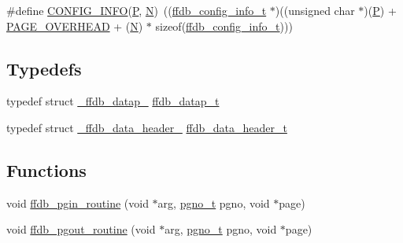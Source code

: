 \begin{DoxyCompactItemize}
\item 
\#define \mbox{\hyperlink{adat-devel_2other__libs_2filedb_2filehash_2ffdb__page_8h_a27811a032e8248cf27b27041873d8de0}{C\+O\+N\+F\+I\+G\+\_\+\+I\+N\+FO}}(\mbox{\hyperlink{adat__devel_2lib_2hadron_2operator__name__util_8cc_aef94be98e2c9e4a4dece75f60ca9792c}{P}},  \mbox{\hyperlink{adat__devel_2lib_2hadron_2operator__name__util_8cc_a7722c8ecbb62d99aee7ce68b1752f337}{N}})~((\mbox{\hyperlink{adat-devel_2other__libs_2filedb_2filehash_2ffdb__db_8h_acc961fbd2faf6a849a1620309100fda1}{ffdb\+\_\+config\+\_\+info\+\_\+t}} $\ast$)((unsigned char $\ast$)(\mbox{\hyperlink{adat__devel_2lib_2hadron_2operator__name__util_8cc_aef94be98e2c9e4a4dece75f60ca9792c}{P}}) + \mbox{\hyperlink{adat__devel_2other__libs_2filedb_2filehash_2ffdb__page_8h_a4be3c5b1517f8928d9819032d1ac4864}{P\+A\+G\+E\+\_\+\+O\+V\+E\+R\+H\+E\+AD}} + (\mbox{\hyperlink{adat__devel_2lib_2hadron_2operator__name__util_8cc_a7722c8ecbb62d99aee7ce68b1752f337}{N}}) $\ast$ sizeof(\mbox{\hyperlink{adat-devel_2other__libs_2filedb_2filehash_2ffdb__db_8h_acc961fbd2faf6a849a1620309100fda1}{ffdb\+\_\+config\+\_\+info\+\_\+t}})))
\end{DoxyCompactItemize}
\subsection*{Typedefs}
\begin{DoxyCompactItemize}
\item 
typedef struct \mbox{\hyperlink{struct__ffdb__datap__}{\+\_\+ffdb\+\_\+datap\+\_\+}} \mbox{\hyperlink{adat-devel_2other__libs_2filedb_2filehash_2ffdb__page_8h_af1593018f0ec0e6539abbf3de31870e6}{ffdb\+\_\+datap\+\_\+t}}
\item 
typedef struct \mbox{\hyperlink{struct__ffdb__data__header__}{\+\_\+ffdb\+\_\+data\+\_\+header\+\_\+}} \mbox{\hyperlink{adat-devel_2other__libs_2filedb_2filehash_2ffdb__page_8h_a66feb3f11a241f917003ff5e94af8a88}{ffdb\+\_\+data\+\_\+header\+\_\+t}}
\end{DoxyCompactItemize}
\subsection*{Functions}
\begin{DoxyCompactItemize}
\item 
void \mbox{\hyperlink{adat-devel_2other__libs_2filedb_2filehash_2ffdb__page_8h_a1af7c7a984e68481194b1457fc9e2165}{ffdb\+\_\+pgin\+\_\+routine}} (void $\ast$arg, \mbox{\hyperlink{adat-devel_2other__libs_2filedb_2filehash_2ffdb__db_8h_a000813331643d38481142bcce7de1501}{pgno\+\_\+t}} pgno, void $\ast$page)
\item 
void \mbox{\hyperlink{adat-devel_2other__libs_2filedb_2filehash_2ffdb__page_8h_a29e873047c5bbb8214d85f3061c2b48c}{ffdb\+\_\+pgout\+\_\+routine}} (void $\ast$arg, \mbox{\hyperlink{adat-devel_2other__libs_2filedb_2filehash_2ffdb__db_8h_a000813331643d38481142bcce7de1501}{pgno\+\_\+t}} pgno, void $\ast$page)
\end{DoxyCompactItemize}


